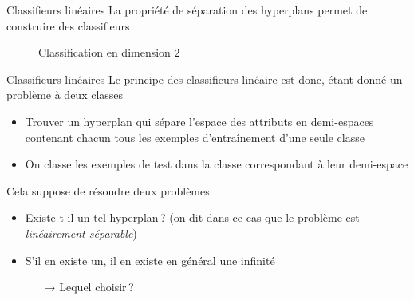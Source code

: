 \documentclass[hyperref={unicode}, xcolor={svgnames}, french]{beamer}
\begin{document}
\begin{frame}{Classifieurs linéaires}
	La propriété de séparation des hyperplans permet de construire des classifieurs
	\begin{figure}
	    \tikzset{external/export=true}
	    \caption{Classification  en dimension $2$}
	\end{figure}
\end{frame}
\begin{frame}{Classifieurs linéaires}
    Le principe des classifieurs linéaire est donc, étant donné un problème à deux classes
    \begin{itemize}
        \item Trouver un hyperplan qui sépare l'espace des attributs en demi-espaces contenant chacun tous les exemples d'entraînement d'une seule classe
        \item On classe les exemples de test dans la classe correspondant à leur demi-espace
    \end{itemize}

    Cela suppose de résoudre deux problèmes
    \begin{itemize}
        \item Existe-t-il un tel hyperplan ? (on dit dans ce cas que le problème est \emph{linéairement séparable})
        \item S'il en existe un, il en existe en général une infinité
            \begin{itemize}
                \item[→] Lequel choisir ?
            \end{itemize}
    \end{itemize}
\end{frame}
\end{document}

